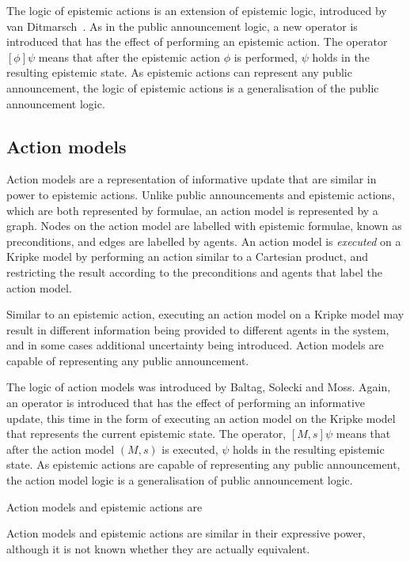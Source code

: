 The logic of epistemic actions is an extension of epistemic logic, 
introduced by van
Ditmarsch~\cite{vanditmarsch1999logic,vanditmarsch2001knowledge,vanditmarsch2007dynamic}.
As in the public announcement logic, a new operator is introduced that has the
effect of performing an epistemic action. The operator $[\phi] \psi$ means that
after the epistemic action $\phi$ is performed, $\psi$ holds in the resulting
epistemic state. As epistemic actions can represent any public announcement, the
logic of epistemic actions is a generalisation of the public announcement logic.

\subsection*{Action models}

Action models are a representation of informative update that are similar in
power to epistemic actions. Unlike public announcements and epistemic actions,
which are both represented by formulae, an action model is represented by a
graph. Nodes on the action model are labelled with epistemic formulae, known as
preconditions, and edges are labelled by agents. An action model is {\em
executed} on a Kripke model by performing an action similar to a Cartesian
product, and restricting the result according to the preconditions and agents
that label the action model. 

Similar to an epistemic action, executing an action model on a Kripke model may
result in different information being provided to different agents in the
system, and in some cases additional uncertainty being introduced. Action models
are capable of representing any public announcement.

The logic of action models was introduced by Baltag, Solecki and
Moss\cite{baltag2004logics}. Again, an operator is introduced that has the
effect of performing an informative update, this time in the form of executing an
action model on the Kripke model that represents the current epistemic state.
The operator, $[M,s]\psi$ means that after the action model $(M, s)$ is
executed, $\psi$ holds in the resulting epistemic state. As epistemic actions
are capable of representing any public announcement, the action model logic is
a generalisation of public announcement logic.

Action models and epistemic actions are 

Action models and epistemic actions are similar in their expressive power,
although it is not known whether they are actually equivalent.

